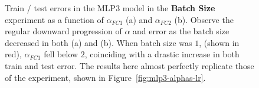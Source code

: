 \begin{figure}[t] %
    \centering

    \caption{
            Train / test errors in the MLP3 model in the {\bf Batch Size} experiment as a function of $\alpha_{FC1}$ 
            (a) and $\alpha_{FC2}$ (b). Observe the regular downward progression of $\alpha$ and error as the batch size
            decreased in both (a) and (b). When batch size was $1$, (shown in red), $\alpha_{FC1}$ fell below $2$, 
            coinciding with a drastic increase in both train and test error. The results here almost perfectly 
            replicate those of the \LearningRate experiment, shown in Figure~\ref{fig:mlp3-alphas-lr}.
    }
 \label{fig:mlp3-alphas-bs}
\end{figure}



